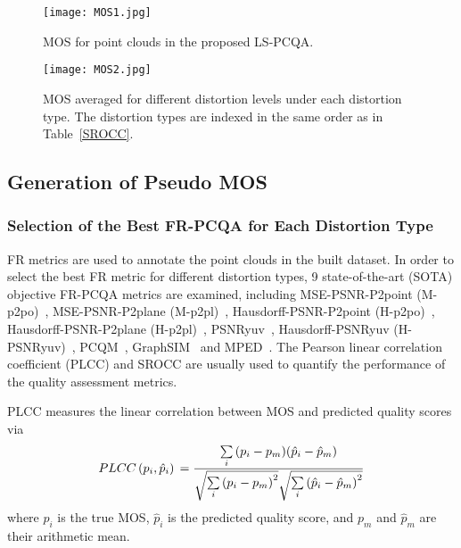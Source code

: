 \documentclass[acmsmall]{acmart}
\begin{document}
\begin{figure*}[htbp]
	\centering
	\texttt{[image: MOS1.jpg]}
	\caption{MOS for point clouds in the proposed LS-PCQA.}
	\label{MOS1}

	\centering
	\texttt{[image: MOS2.jpg]}
	\caption{MOS averaged for different distortion levels under each distortion type. The distortion types are indexed in the same order as in Table~\ref{SROCC}.}
	\label{MOS2}

\end{figure*}




\subsection{Generation of Pseudo MOS} \label{sec:remaininglabeling}

\subsubsection{Selection of the Best FR-PCQA for Each Distortion Type}

\par FR metrics are used to annotate the point clouds in the built dataset. In order to select the best FR metric for different distortion types, 9 state-of-the-art (SOTA) objective FR-PCQA metrics are examined, including MSE-PSNR-P2point (M-p2po)~\cite{cignoni1998metro,MPEGSoft}, MSE-PSNR-P2plane (M-p2pl)~\cite{Mekuria2016Evaluation,MPEGSoft}, Hausdorff-PSNR-P2point (H-p2po)~\cite{cignoni1998metro,MPEGSoft}, Hausdorff-PSNR-P2plane (H-p2pl)~\cite{Mekuria2016Evaluation,MPEGSoft}, PSNRyuv~\cite{MPEGSoft}, Hausdorff-PSNRyuv (H-PSNRyuv)~\cite{MPEGSoft}, PCQM~\cite{meynet2020pcmd}, GraphSIM~\cite{yang2020graphsim} and MPED~\cite{yang2021MPED}. The Pearson linear correlation coefficient (PLCC) and SROCC are usually used to quantify the performance of the quality assessment metrics.

\par PLCC measures the linear correlation between MOS and predicted quality scores via
\begin{align}
PLCC\left( {{p_i},{{\hat p}_i}} \right){\rm{ }} = \frac{{\sum\limits_i {({p_i} - {p_m})({{\hat p}_i} - {{\hat p}_m})} }}{{\sqrt {\sum\limits_i {{{({p_i} - {p_m})}^2}} } \sqrt {\sum\limits_i {{{({{\hat p}_i} - {{\hat p}_m})}^2}} } }}
\end{align}
where $p_i$ is the true MOS, ${\hat p}_i$ is the predicted quality score, and $p_m$ and ${\hat p}_m$ are their arithmetic mean.
\end{document}
